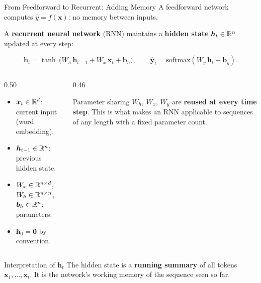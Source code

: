 \documentclass[aspectratio=169]{beamer}
\begin{document}
\begin{frame}{From Feedforward to Recurrent: Adding Memory}
\small
A feedforward network computes $\hat{y} = f(\bm{x})$: no memory between inputs.

\vspace{0.15cm}
A \textbf{recurrent neural network} (RNN) maintains a \textbf{hidden state}
$\bm{h}_t \in \mathbb{R}^n$ updated at every step:

\[
\boxed{
\bm{h}_t = \tanh\,\bigl(W_h\,\bm{h}_{t-1} + W_x\,\bm{x}_t + \bm{b}_h\bigr),
\qquad
\hat{\bm{y}}_t = \text{softmax}(W_y\,\bm{h}_t + \bm{b}_y).
}
\]

\vspace{0.1cm}
\begin{columns}[T]
\begin{column}{0.50\textwidth}
\begin{itemize}
    \item $\bm{x}_t \in \mathbb{R}^d$: current input (word embedding).
    \item $\bm{h}_{t-1} \in \mathbb{R}^n$: previous hidden state.
    \item $W_x \in \mathbb{R}^{n \times d}$, $W_h \in \mathbb{R}^{n \times n}$, $\bm{b}_h \in \mathbb{R}^n$: parameters.
    \item $\bm{h}_0 = \bm{0}$ by convention.
\end{itemize}
\end{column}
\begin{column}{0.46\textwidth}
\begin{alertblock}{Parameter sharing}
$W_h$, $W_x$, $W_y$ are \textbf{reused at every time step}.
This is what makes an RNN applicable to sequences of any length with a fixed parameter count.
\end{alertblock}
\end{column}
\end{columns}

\vspace{0.1cm}
\begin{block}{Interpretation of $\bm{h}_t$}
The hidden state is a \textbf{running summary} of all tokens $\bm{x}_1, \ldots, \bm{x}_t$.
It is the network's working memory of the sequence seen so far.
\end{block}
\end{frame}
%
%
\end{document}
